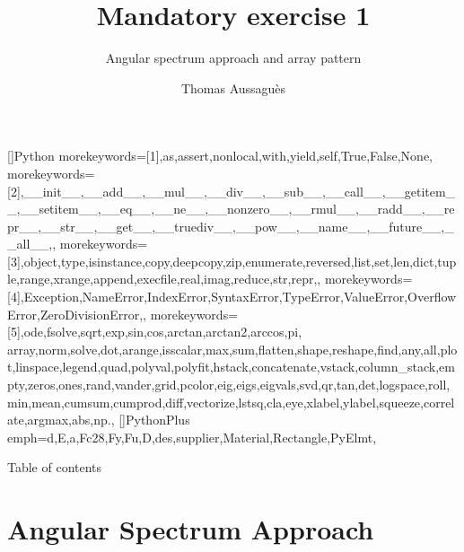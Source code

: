 \documentclass[UKenglish,8pt,aspectratio=1610]{beamer}
\author{Thomas Aussaguès}
\title{Mandatory exercise 1}
\subtitle{Angular spectrum approach and array pattern}
\begin{document}
\renewcommand{\arraystretch}{1.3}	
	
	
	[]{Python}{
		morekeywords=[1]{,as,assert,nonlocal,with,yield,self,True,False,None,} %
		morekeywords=[2]{,__init__,__add__,__mul__,__div__,__sub__,__call__,__getitem__,__setitem__,__eq__,__ne__,__nonzero__,__rmul__,__radd__,__repr__,__str__,__get__,__truediv__,__pow__,__name__,__future__,__all__,}, %
		morekeywords=[3]{,object,type,isinstance,copy,deepcopy,zip,enumerate,reversed,list,set,len,dict,tuple,range,xrange,append,execfile,real,imag,reduce,str,repr,}, %
		morekeywords=[4]{,Exception,NameError,IndexError,SyntaxError,TypeError,ValueError,OverflowError,ZeroDivisionError,}, %
		morekeywords=[5]{,ode,fsolve,sqrt,exp,sin,cos,arctan,arctan2,arccos,pi, array,norm,solve,dot,arange,isscalar,max,sum,flatten,shape,reshape,find,any,all,plot,linspace,legend,quad,polyval,polyfit,hstack,concatenate,vstack,column_stack,empty,zeros,ones,rand,vander,grid,pcolor,eig,eigs,eigvals,svd,qr,tan,det,logspace,roll,min,mean,cumsum,cumprod,diff,vectorize,lstsq,cla,eye,xlabel,ylabel,squeeze,correlate,argmax,abs,np.}, %
	}
	[]{PythonPlus}{
		emph={d,E,a,Fc28,Fy,Fu,D,des,supplier,Material,Rectangle,PyElmt},
	}
	
	
	\begin{frame}{Table of contents}
		\tableofcontents
	\end{frame}
	
	\section{Angular Spectrum Approach}
\end{document}
